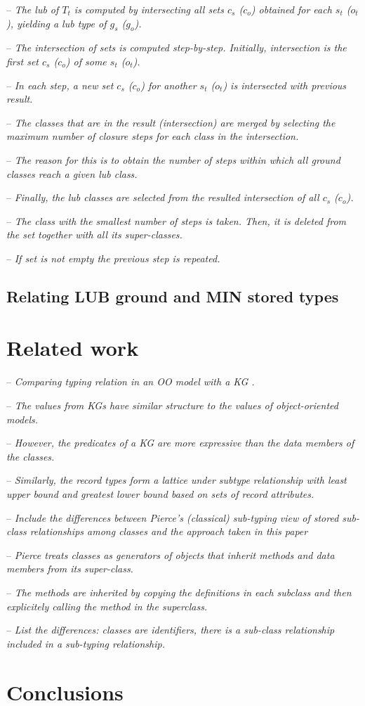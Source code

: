 \documentclass[runningheads]{llncs}
\newcommand{\notes}[1]{\noindent\begin{small}-- \emph{#1}\hfill\break\end{small}}
\begin{document}
\notes{The lub of $T_t$ is computed by intersecting all sets $c_s$ ($c_o$) obtained for each $s_t$ ($o_t$), yielding a lub type of $g_s$ ($g_o$).}
\notes{The intersection of sets is computed step-by-step. Initially, intersection is the first set $c_s$ ($c_o$) of some $s_t$ ($o_t$).}
\notes{In each step, a new set $c_s$ ($c_o$) for another $s_t$ ($o_t$) is intersected with previous result.}
\notes{The classes that are in the result (intersection) are merged by selecting the maximum number of closure steps for each class in the intersection.}
\notes{The reason for this is to obtain the number of steps within which all ground classes reach a given lub class.}

\notes{Finally, the lub classes are selected from the resulted intersection of all $c_s$ ($c_o$).}
\notes{The class with the smallest number of steps is taken. Then, it is deleted from the set together with all its super-classes.}
\notes{If set is not empty the previous step is repeated.}



\subsection{Relating LUB ground and MIN stored types}









\section{Related work}

\notes{Comparing typing relation in an OO model with a KG \cite{Pierce2002}.}
\notes{The values from KGs have similar structure to the values of object-oriented models.}
\notes{However, the predicates of a KG are more expressive than the data members of the classes.}
\notes{Similarly, the record types form a lattice under subtype relationship with least upper bound and greatest lower bound based on sets of record attributes.}

\notes{Include the differences between Pierce's (classical) sub-typing view of stored sub-class relationships among classes and the approach taken in this paper}
\notes{Pierce treats classes as generators of objects that inherit methods and data members from its super-class.}
\notes{The methods are inherited by copying the definitions in each subclass and then explicitely calling the method in the superclass.}
\notes{List the differences: classes are identifiers, there is a sub-class relationship included in a sub-typing relationship.}





\section{Conclusions}



%



\end{document}
